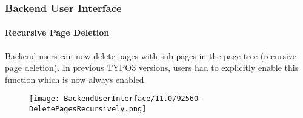 %

\begin{frame}[fragile]
	\frametitle{Backend User Interface}
	\framesubtitle{Recursive Page Deletion}

	Backend users can now delete pages with sub-pages in the page tree (recursive page deletion).
	In previous TYPO3 versions, users had to explicitly enable this function which is now always enabled.

	\begin{figure}
		\texttt{[image: BackendUserInterface/11.0/92560-DeletePagesRecursively.png]}
	\end{figure}

\end{frame}

